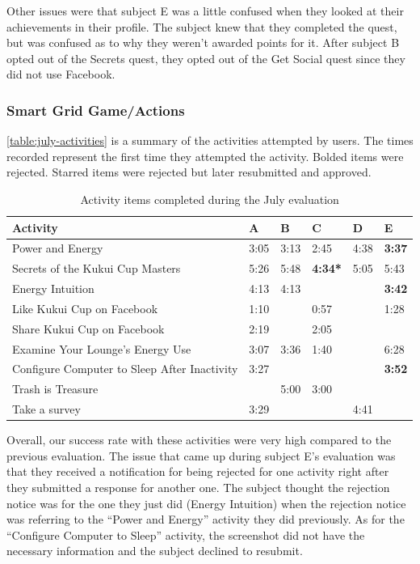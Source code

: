 Other issues were that subject E was a little confused when they looked at their achievements in their profile. The subject knew that they completed the quest, but was confused as to why they weren't awarded points for it. After subject B opted out of the Secrets quest, they opted out of the Get Social quest since they did not use Facebook.

\subsubsection{Smart Grid Game/Actions}

\autoref{table:july-activities} is a summary of the activities attempted by users. The times recorded represent the first time they attempted the activity. Bolded items were rejected. Starred items were rejected but later resubmitted and approved.

\begin{table}[t]
	\begin{tabular}{| l || p{1cm} | p{1cm} | p{1cm} | p{1cm} | p{1cm} |}
		\hline
		Activity & A & B & C & D & E \\
		\hline
		Power and Energy & 3:05 & 3:13 & 2:45 & 4:38 & \bf{3:37} \\
    Secrets of the Kukui Cup Masters & 5:26 & 5:48 & \bf{4:34}* & 5:05 & 5:43 \\
    Energy Intuition & 4:13 & 4:13 & & & \bf{3:42} \\
    Like Kukui Cup on Facebook & 1:10 & & 0:57 & & 1:28 \\
    Share Kukui Cup on Facebook & 2:19 & & 2:05 & & \\
    Examine Your Lounge's Energy Use & 3:07 & 3:36 & 1:40 & & 6:28 \\
    Configure Computer to Sleep After Inactivity & 3:27 & & & & \bf{3:52} \\
    Trash is Treasure & & 5:00 & 3:00 & & \\
    Take a survey & 3:29 & & & 4:41 & \\
		\hline
	\end{tabular}
	\caption{Activity items completed during the July evaluation}
	\label{table:july-activities}
\end{table}

Overall, our success rate with these activities were very high compared to the previous evaluation. The issue that came up during subject E's evaluation was that they received a notification for being rejected for one activity right after they submitted a response for another one. The subject thought the rejection notice was for the one they just did (Energy Intuition) when the rejection notice was referring to the ``Power and Energy'' activity they did previously. As for the ``Configure Computer to Sleep'' activity, the screenshot did not have the necessary information and the subject declined to resubmit.

